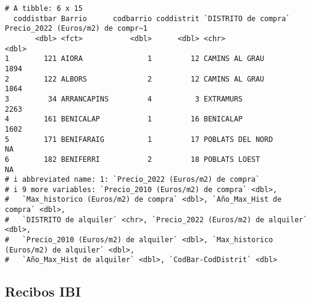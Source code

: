 \documentclass[notspecified,article,submit,moreauthors,pdftex]{Definitions/mdpi}
\begin{document}
\begin{verbatim}
# A tibble: 6 x 15
  coddistbar Barrio      codbarrio coddistrit `DISTRITO de compra` Precio_2022 (Euros/m2) de compr~1
       <dbl> <fct>           <dbl>      <dbl> <chr>                                            <dbl>
1        121 AIORA               1         12 CAMINS AL GRAU                                    1894
2        122 ALBORS              2         12 CAMINS AL GRAU                                    1864
3         34 ARRANCAPINS         4          3 EXTRAMURS                                         2263
4        161 BENICALAP           1         16 BENICALAP                                         1602
5        171 BENIFARAIG          1         17 POBLATS DEL NORD                                    NA
6        182 BENIFERRI           2         18 POBLATS LOEST                                       NA
# i abbreviated name: 1: `Precio_2022 (Euros/m2) de compra`
# i 9 more variables: `Precio_2010 (Euros/m2) de compra` <dbl>,
#   `Max_historico (Euros/m2) de compra` <dbl>, `Año_Max_Hist de compra` <dbl>,
#   `DISTRITO de alquiler` <chr>, `Precio_2022 (Euros/m2) de alquiler` <dbl>,
#   `Precio_2010 (Euros/m2) de alquiler` <dbl>, `Max_historico (Euros/m2) de alquiler` <dbl>,
#   `Año_Max_Hist de alquiler` <dbl>, `CodBar-CodDistrit` <dbl>
\end{verbatim}

\hypertarget{recibos-ibi}{%
\subsection{Recibos IBI}\label{recibos-ibi}}
\end{document}

